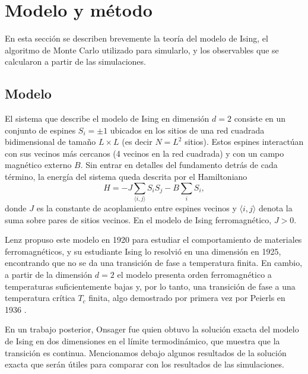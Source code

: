 \documentclass[a4paper,11pt]{article}
\newcommand{\Tc}{T_c}
\begin{document}
\section{Modelo y método}
\label{sec:metodo}
En esta sección se describen brevemente la teoría del modelo de Ising, el algoritmo de Monte Carlo utilizado para simularlo, y los observables que se calcularon a partir de las simulaciones.
\subsection{Modelo}
El sistema que describe el modelo de Ising en dimensión $d=2$ consiste en un conjunto de espines $S_i = \pm 1$ ubicados en los sitios de una red cuadrada bidimensional de tamaño $L \times L$ (es decir $N = L^2$ sitios).
Estos espines interactúan con sus vecinos más cercanos (4 vecinos en la red cuadrada) y con un campo magnético externo $B$.
Sin entrar en detalles del fundamento detrás de cada término, la energía del sistema queda descrita por el Hamiltoniano \cite{salinasIntroductionStatisticalPhysics2001}
\begin{equation}
  H = -J \sum_{\langle i,j \rangle} S_i S_j - B \sum_i S_i ,
\end{equation}
donde $J$ es la constante de acoplamiento entre espines vecinos y $\langle i,j \rangle$ denota la suma sobre pares de sitios vecinos.
En el modelo de Ising ferromagnético, $J > 0$.

Lenz propuso este modelo en 1920 para estudiar el comportamiento de materiales ferromagnéticos, y su estudiante Ising lo resolvió en una dimensión en 1925, encontrando que no se da una transición de fase a temperatura finita. 
En cambio, a partir de la dimensión $d=2$ el modelo presenta orden ferromagnético a temperaturas suficientemente bajas y, por lo tanto, una transición de fase a una temperatura crítica $\Tc$ finita, algo demostrado por primera vez por Peierls en 1936 \cite{deoliveiraOriginsIsingModel2025}.

En un trabajo posterior, Onsager fue quien obtuvo la solución exacta del modelo de Ising en dos dimensiones en el límite termodinámico, que muestra que la transición es continua. 
Mencionamos debajo algunos resultados de la solución exacta que serán útiles para comparar con los resultados de las simulaciones.
\end{document}

